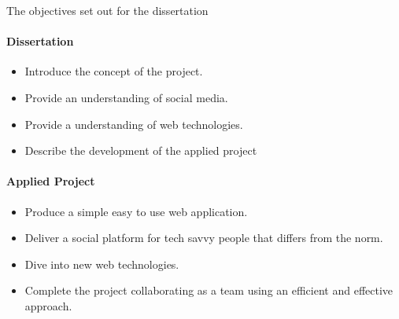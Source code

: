 The objectives set out for the dissertation 
\paragraph{Dissertation}
\begin{itemize}
\item Introduce the concept of the project. 
\item Provide an understanding of social media.
\item Provide a understanding of web technologies.
\item Describe the development of the applied project
\end{itemize}
 
 \paragraph{Applied Project}
\begin{itemize}
\item Produce a simple easy to use web application.
\item Deliver a social platform for tech savvy people that differs from the norm.
\item Dive into new web technologies.
\item Complete the project collaborating as a team using an efficient and effective approach.
\end{itemize}


